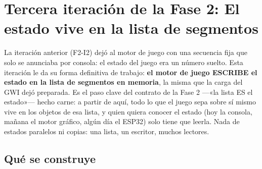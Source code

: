 \section{Tercera iteración de la Fase 2: El estado vive en la lista de segmentos}
\label{sec:EstadoEnLista}

La iteración anterior (F2-I2) dejó al motor de juego con una secuencia fija que solo se
anunciaba por consola: el estado del juego era un número suelto. Esta iteración le da su
forma definitiva de trabajo: \textbf{el motor de juego ESCRIBE el estado en la lista de
	segmentos en memoria}, la misma que la carga del GWI dejó preparada. Es el paso clave del
contrato de la Fase 2 ---«la lista ES el estado»--- hecho carne: a partir de aquí, todo lo
que el juego sepa sobre sí mismo vive en los objetos de esa lista, y quien quiera conocer
el estado (hoy la consola, mañana el motor gráfico, algún día el ESP32) solo tiene que
leerla. Nada de estados paralelos ni copias: una lista, un escritor, muchos lectores.

\subsection{Qué se construye}
\label{subsec:QueSeConstruyeF2I3}


